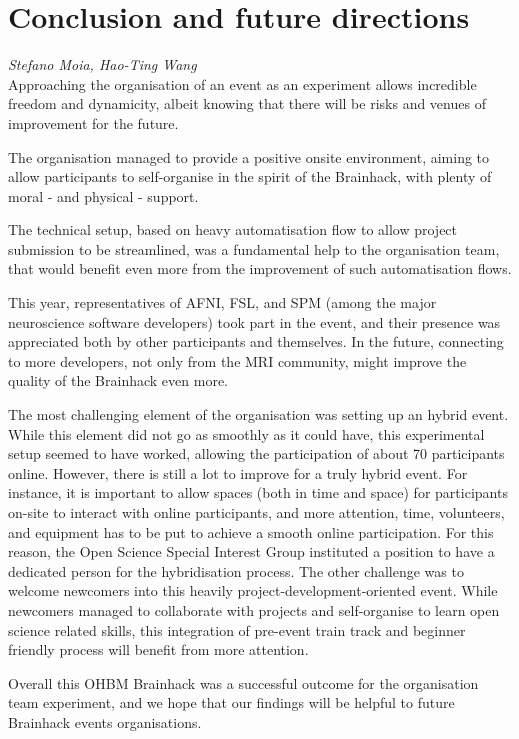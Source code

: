 \documentclass[12pt,a4paper]{proc}
\let\Oldsection\section
\renewcommand{\section}{\FloatBarrier\Oldsection}
\newcommand{\authors}[1]{\emph{\footnotesize #1} \\}
\begin{document}








\vfill\eject
\columnbreak








\section{Conclusion and future directions}
\authors{Stefano Moia, %
Hao-Ting Wang}
%

Approaching the organisation of an event as an experiment allows
incredible freedom and dynamicity, albeit knowing that there will be
risks and venues of improvement for the future.

The organisation managed to provide a positive onsite environment,
aiming to allow participants to self-organise in the spirit of the
Brainhack\cite{Gau2021}, with plenty of moral - and physical - support.

The technical setup, based on heavy automatisation flow to allow project
submission to be streamlined, was a fundamental help to the organisation
team, that would benefit even more from the improvement of such
automatisation flows.

This year, representatives of AFNI, FSL, and SPM (among the major
neuroscience software developers) took part in the event, and their
presence was appreciated both by other participants and themselves. In
the future, connecting to more developers, not only from the MRI
community, might improve the quality of the Brainhack even more.

The most challenging element of the organisation was setting up an
hybrid event. While this element did not go as smoothly as it could
have, this experimental setup seemed to have worked, allowing the
participation of about 70 participants online. However, there is still a
lot to improve for a truly hybrid event. For instance, it is important
to allow spaces (both in time and space) for participants on-site to
interact with online participants, and more attention, time, volunteers,
and equipment has to be put to achieve a smooth online participation.
For this reason, the Open Science Special Interest Group instituted a
position to have a dedicated person for the hybridisation process. The
other challenge was to welcome newcomers into this heavily
project-development-oriented event. While newcomers managed to
collaborate with projects and self-organise to learn open science
related skills, this integration of pre-event train track and beginner
friendly process will benefit from more attention.

Overall this OHBM Brainhack was a successful outcome for the organisation
team experiment, and we hope that our findings will be helpful to future
Brainhack events organisations.


\printbibliography
\end{document}
